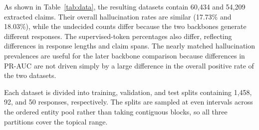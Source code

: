\documentclass[conference]{IEEEtran}
\begin{document}
\begin{table}[ht]

\centering

\small

\caption{Statistics of the two native Persian uncertainty datasets.}

\label{tab:data}


\end{table}

As shown in Table~\ref{tab:data}, the resulting datasets contain 60,434 and 54,209 extracted claims. Their overall hallucination rates are similar (17.73\% and 18.03\%), while the undecided counts differ because the two backbones generate different responses. The supervised-token percentages also differ, reflecting differences in response lengths and claim spans. The nearly matched hallucination prevalences are useful for the later backbone comparison because differences in PR-AUC are not driven simply by a large difference in the overall positive rate of the two datasets.

Each dataset is divided into training, validation, and test splits containing 1,458, 92, and 50 responses, respectively. The splits are sampled at even intervals across the ordered entity pool rather than taking contiguous blocks, so all three partitions cover the topical range.
\end{document}
